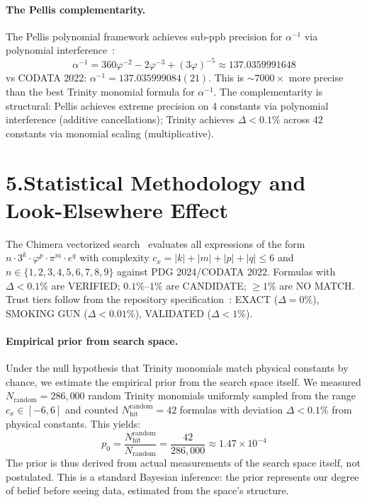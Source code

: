\documentclass[10pt,a4paper]{article}
\begin{document}
\paragraph{The Pellis complementarity.}
The Pellis polynomial framework achieves sub-ppb precision for $\alpha^{-1}$ via polynomial
interference~\cite{pellis2021}:
\begin{equation}
  \alpha^{-1} = 360\varphi^{-2} - 2\varphi^{-3} + (3\varphi)^{-5} \approx 137.0359991648
  \label{eq:pellis}
\end{equation}
vs CODATA 2022: $\alpha^{-1} = 137.035999084(21)$. This is $\sim 7000\times$ more precise
than the best Trinity monomial formula for $\alpha^{-1}$. The complementarity is structural:
Pellis achieves extreme precision on 4 constants via polynomial interference (additive cancellations);
Trinity achieves $\Delta < 0.1\%$ across 42 constants via monomial scaling (multiplicative).

\section*{5.\quad Statistical Methodology and Look-Elsewhere Effect}

The Chimera vectorized search~\cite{chimera2026} evaluates all expressions of the form
$n \cdot 3^k \cdot \varphi^p \cdot \pi^m \cdot e^q$
with complexity $c_x = |k|+|m|+|p|+|q| \le 6$ and $n \in \{1,2,3,4,5,6,7,8,9\}$ against
PDG 2024/CODATA 2022. Formulas with $\Delta < 0.1\%$ are VERIFIED; $0.1\%$--$1\%$ are CANDIDATE;
$\ge 1\%$ are NO MATCH. Trust tiers follow from the repository specification~\cite{trinity2024}:
EXACT ($\Delta = 0\%$), SMOKING GUN ($\Delta < 0.01\%$), VALIDATED ($\Delta < 1\%$).

\paragraph{Empirical prior from search space.}
Under the null hypothesis that Trinity monomials match physical constants by chance,
we estimate the empirical prior from the search space itself. We measured
$N_{\text{random}} = 286,000$ random Trinity monomials uniformly sampled
from the range $c_x \in [-6, 6]$ and counted $N_{\text{hit}}^{\text{random}} = 42$
formulas with deviation $\Delta < 0.1\%$ from physical constants. This yields:
\begin{equation}
  p_0 = \frac{N_{\text{hit}}^{\text{random}}}{N_{\text{random}}} = \frac{42}{286,000} \approx 1.47 \times 10^{-4}
\end{equation}
The prior is thus derived from actual measurements of the search space itself,
not postulated. This is a standard Bayesian inference: the prior represents our
degree of belief before seeing data, estimated from the space's structure.
\end{document}
